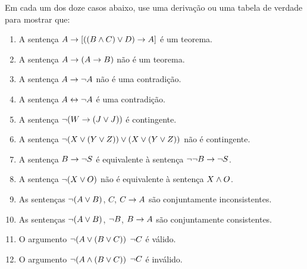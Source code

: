 \practiceproblems
\noindent\problempart Em cada um dos doze casos abaixo, use uma  derivação ou uma tabela de verdade para mostrar que: 
\begin{enumerate}%
\item  A sentença $A \rightarrow [((B \wedge C) \vee D) \rightarrow A]$  é um teorema.
\item  A sentença $A \rightarrow (A \rightarrow B)$  não é um teorema.
\item  A sentença $A \rightarrow \neg{A}$ não é uma contradição. 
\item  A sentença $A \leftrightarrow \neg A$ é uma contradição.  
\item  A sentença $ \neg (W \rightarrow (J \vee J)) $  é contingente.
\item  A sentença $ \neg(X \vee (Y \vee Z)) \vee (X \vee (Y \vee Z))$  não é contingente.
\item  A sentença $B \rightarrow \neg S$  é equivalente à sentença $\neg \neg B \rightarrow \neg S$.
\item  A sentença $ \neg (X \vee O) $ não é equivalente à sentença $X \wedge O$.
\item  As sentenças $\neg(A \vee B)$, $C$, $C \rightarrow A$  são conjuntamente inconsistentes.
\item  As sentenças $\neg(A \vee B)$, $\neg{B}$, $B \rightarrow A$ são conjuntamente consistentes.
\item  O argumento $\neg(A \vee (B \vee C)) $ \therefore $ \neg{C}$ é válido.
\item  O argumento $\neg(A \wedge (B \vee C))$ \therefore $ \neg{C}$ é  inválido.
\end{enumerate}



